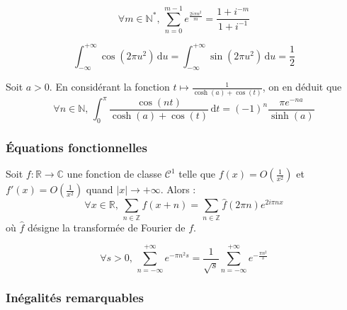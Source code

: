 
  \begin{application}
    \[ \forall m \in \mathbb{N}^*, \, \sum_{n=0}^{m-1} e^{\frac{2i\pi n^2}{m}} = \frac{1+i^{-m}}{1+i^{-1}} \]
  \end{application}

  \begin{application}
    \[ \int_{-\infty}^{+\infty} \cos(2 \pi u^2) \, \mathrm{d}u = \int_{-\infty}^{+\infty} \sin(2 \pi u^2) \, \mathrm{d}u = \frac{1}{2} \]
  \end{application}


  \begin{application}
    Soit $a > 0$. En considérant la fonction $t \mapsto \frac{1}{\cosh(a) + \cos(t)}$, on en déduit que
    \[ \forall n \in \mathbb{N}, \, \int_{0}^{\pi} \frac{\cos(nt)}{\cosh(a) + \cos(t)} \, \mathrm{d}t = (-1)^n \frac{\pi e^{-na}}{\sinh(a)} \]
  \end{application}

  \subsubsection{Équations fonctionnelles}


  \begin{theorem}
    Soit $f : \mathbb{R} \rightarrow \mathbb{C}$ une fonction de classe $\mathcal{C}^1$ telle que $f(x) = O \left( \frac{1}{x^2} \right)$ et $f'(x) = O \left( \frac{1}{x^2} \right)$ quand $|x| \longrightarrow +\infty$. Alors :
    \[ \forall x \in \mathbb{R}, \, \sum_{n \in \mathbb{Z}} f(x+n) = \sum_{n \in \mathbb{Z}} \widehat{f}(2 \pi n) e^{2 i \pi n x} \]
    où $\widehat{f}$ désigne la transformée de Fourier de $f$.
  \end{theorem}

  \begin{application}
    \[ \forall s > 0, \, \sum_{n=-\infty}^{+\infty} e^{-\pi n^2 s} = \frac{1}{\sqrt{s}} \sum_{n=-\infty}^{+\infty} e^{-\frac{\pi n^2}{s}} \]
  \end{application}

  \subsubsection{Inégalités remarquables}

